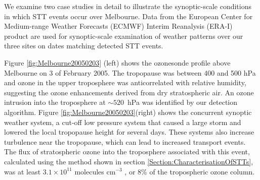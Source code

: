 \documentclass{article}
\begin{document}
    We examine two case studies in detail to illustrate the synoptic-scale conditions in which STT events occur over Melbourne.
    Data from the European Center for Medium-range Weather Forecasts (ECMWF) Interim Reanalysis (ERA-I) \citep{Dee2011} product are used for synoptic-scale examination of weather patterns over our three sites on dates matching detected STT events.
    
    Figure \ref{fig:Melbourne20050203} (left) shows the ozonesonde profile above Melbourne on 3 of February 2005.
    The tropopause was between 400 and 500 hPa and ozone in the upper troposphere was anticorrelated with relative humidity, suggesting the ozone enhancements derived from dry stratospheric air. 
    An ozone intrusion into the troposphere at $\sim520$~hPa was identified by our detection algorithm.
    Figure \ref{fig:Melbourne20050203}(right) shows the concurrent synoptic weather system, a cut-off low pressure system that caused a large storm and lowered the local tropopause height for several days.
    These systems also increase turbulence near the tropopause, which can lead to increased transport events.
    The flux of stratospheric ozone into the troposphere associated with this event, calculated using the method shown in section \ref{Section:CharacterisationOfSTTs}, was at least $3.1 \times 10^{11}$ molecules cm$^{-3}$ , or 8\% of the tropospheric ozone column.
\end{document}
